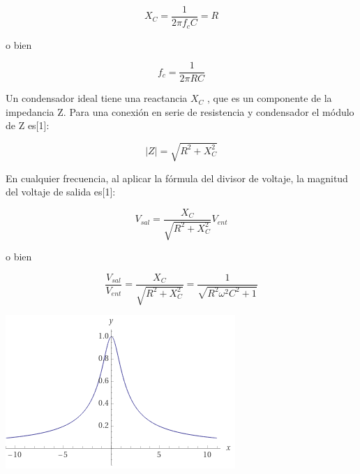\documentclass[DIV=calc, paper=a4, fontsize=11pt]{scrartcl}
\newenvironment{Figura}
  {\par\medskip\noindent\minipage{\linewidth}}
  {\endminipage\par\medskip}
\begin{document}
\begin{multicols}{2}
\begin{equation*}
    X_C = \frac{1}{2 \pi f_c C } = R
\end{equation*}

o bien

\begin{equation*}
    f_c = \frac{1}{2 \pi RC}
\end{equation*}

Un condensador ideal tiene una reactancia $X_C$ , que es un componente de la impedancia Z. Para una conexión en serie de resistencia y condensador el módulo de Z es[1]:

\begin{equation*}
    |Z| = \sqrt{R^2 + X_{C}^{2}}
\end{equation*}

En cualquier frecuencia, al aplicar la fórmula del divisor de voltaje, la magnitud del voltaje de salida es[1]:

\begin{equation*}
    V_{sal} = \frac{X_C}{\sqrt{R^2 + X_{C}^{2}}} V_{ent}
\end{equation*}

o bien

\begin{equation}
    \frac{V_{sal}}{V_{ent}} = \frac{X_C}{\sqrt{R^2 + X_{C}^{2}}} = \frac{1}{\sqrt{R^2 \omega^2 C^2 + 1}}
\end{equation}

\begin{Figura}
    \centering
    \includegraphics[width=1 \textwidth]{grafica VsVe vs frec.PNG}
    \label{fig}
\end{Figura}


\end{multicols}
\end{document}
